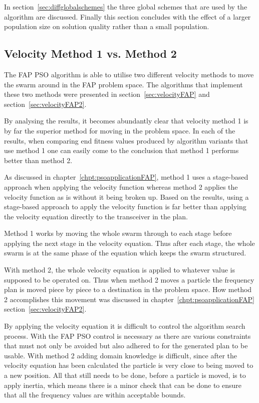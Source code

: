 In section~\ref{sec:diffglobalschemes} the three global schemes that are used by the algorithm are discussed. Finally this section concludes with the effect of a larger population size on solution quality rather than a small population.
\subsection{Velocity Method 1 vs. Method 2}
The FAP PSO algorithm is able to utilise two different velocity methods to move the swarm around in the FAP problem space. The algorithms that implement these two methods were presented in section~\ref{sec:velocityFAP} and section~\ref{sec:velocityFAP2}.

By analysing the results, it becomes abundantly clear that velocity method 1 is by far the superior method for moving in the problem space. In each of the results, when comparing end fitness values produced by algorithm variants that use method 1 one can easily come to the conclusion that method 1 performs better than method 2.

As discussed in chapter~\ref{chpt:psoapplicationFAP}, method 1 uses a stage-based approach when applying the velocity function whereas method 2 applies the velocity function as is without it being broken up. Based on the results, using a stage-based approach to apply the velocity function is far better than applying the velocity equation directly to the transceiver in the plan.

Method 1 works by moving the whole swarm through to each stage before applying the next stage in the velocity equation. Thus after each stage, the whole swarm is at the same phase of the equation which keeps the swarm structured.

With method 2, the whole velocity equation is applied to whatever value is supposed to be operated on. Thus when method 2 moves a particle the frequency plan is moved piece by piece to a destination in the problem space. How method 2 accomplishes this movement was discussed in chapter~\ref{chpt:psoapplicationFAP} section~\ref{sec:velocityFAP2}.

By applying the velocity equation it is difficult to control the algorithm search process. With the FAP PSO control is necessary as there are various constraints that must not only be avoided but also adhered to for the generated plan to be usable. With method 2 adding domain knowledge is difficult, since after the velocity equation has been calculated the particle is very close to being moved to a new position. All that still needs to be done, before a particle is moved, is to apply inertia, which means there is a minor check that can be done to ensure that all the frequency values are within acceptable bounds.

